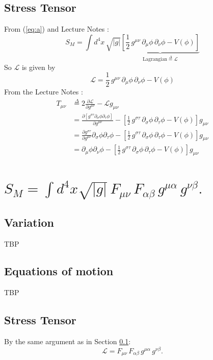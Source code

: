 \documentclass[]{article}
\newcommand{\Lagr}{\mathscr{L}}
\begin{document}
\subsection{Stress Tensor} \label{subseq:StressTensor}
From (\ref{eq:a}) and Lecture Notes \cite[Lecture III, Section 3]{akhmedev2016}:
\begin{equation}
S_M = \int d^4x \, \sqrt{|g|} \underbrace{\left[\frac12 \, g^{\mu\nu} \, \partial_\mu \phi \, \partial_\nu \phi - V(\phi)\right]}_{\text{Lagrangian}\overset{\Delta}{=}\Lagr}
\end{equation}
So $\Lagr$ is given by
\begin{equation}
\Lagr=\frac12 \, g^{\mu\nu} \, \partial_\mu \phi \, \partial_\nu \phi - V(\phi)
\end{equation}
From the Lecture Notes \cite[(64)]{akhmedev2016}:
\begin{align}
T_{\mu\nu}&\overset{\Delta}{=}2 \frac{\partial \Lagr}{\partial g^{\mu\nu}} - \Lagr g_{\mu\nu} \nonumber \\
&=\frac{\partial [g^{\sigma\tau}\partial_\sigma \phi \partial_\tau \phi]}{\partial g^{\mu\nu}}-[\frac12 \, g^{\sigma\tau} \, \partial_\sigma \phi \, \partial_\tau \phi - V(\phi)] g_{\mu\nu} \nonumber \\
&=\frac{\partial g^{\sigma\tau}}{\partial g^{\mu\nu}}\partial_\sigma \phi \partial_\tau \phi-[\frac12 \, g^{\sigma\tau} \, \partial_\sigma \phi \, \partial_\tau \phi - V(\phi)] g_{\mu\nu} \nonumber \\
&=\partial_\mu \phi \partial_\nu \phi - [\frac12 \, g^{\sigma\tau} \, \partial_\sigma \phi \, \partial_\tau \phi - V(\phi)] g_{\mu\nu} 
\end{align}

\section{$S_M = \int d^4x \sqrt{|g|} \, F_{\mu\nu}\, F_{\alpha\beta} \, g^{\mu\alpha} \, g^{\nu\beta}.$}
\subsection{Variation}
TBP
\subsection{Equations of motion}
TBP
\subsection{Stress Tensor}
By the same argument as in Section \ref{subseq:StressTensor}:
\begin{equation}
\Lagr= F_{\mu\nu}\, F_{\alpha\beta} \, g^{\mu\alpha} \, g^{\nu\beta}.
\label {eq:a}
\end{equation}
\end{document}
